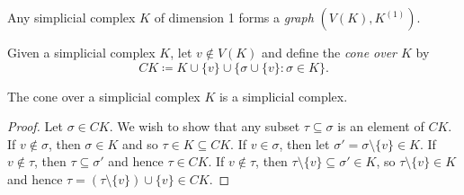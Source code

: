 \begin{example}
    Any simplicial complex $K$ of dimension 1 forms a \emph{graph} $(V(K), K^{(1)})$.
\end{example}

\begin{definition}
    Given a simplicial complex $K$, let $v \notin V(K)$ and define the \emph{cone over $K$} by
    \[
        \mathit{CK} \coloneqq K \cup \{v\} \cup \{\sigma \cup \{v\} : \sigma \in K\}.
    \]
\end{definition}

\begin{proposition}
    The cone over a simplicial complex $K$ is a simplicial complex.
\end{proposition}
\begin{proof}
    Let $\sigma \in \mathit{CK}$. We wish to show that any subset $\tau \subseteq \sigma$ is an element of $\mathit{CK}$. If $v \notin \sigma$, then
    $\sigma \in K$ and so $\tau \in K \subseteq \mathit{CK}$. If $v \in \sigma$, then let $\sigma' = \sigma \setminus \{v\} \in K$. If
    $v \notin \tau$, then $\tau \subseteq \sigma'$ and hence $\tau \in \mathit{CK}$. If $v \notin \tau$, then $\tau \setminus \{v\} \subseteq
    \sigma' \in K$, so $\tau \setminus \{v\} \in K$ and hence $\tau = (\tau \setminus \{v\}) \cup \{v\} \in \mathit{CK}$.
\end{proof}

